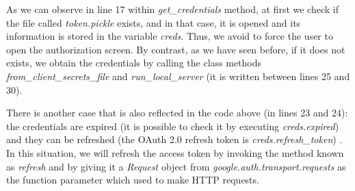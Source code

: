 As we can observe in line 17 within \textit{get\_credentials} method, at first we check if the file called \textit{token.pickle} exists, and in that case, it is opened and its information is stored in the variable \textit{creds}. Thus, we avoid to force the user to open the authorization screen. By contrast, as we have seen before, if it does not exists, we obtain the credentials by calling the class methods \textit{from\_client\_secrets\_file} and \textit{run\_local\_server} (it is written between lines 25 and 30).

There is another case that is also reflected in the code above (in lines 23 and 24): the credentials are expired (it is possible to check it by executing \textit{creds.expired}) and they can be refreshed (the OAuth 2.0 refresh token is \textit{creds.refresh\_token}) \citep{oauth2.credentials}. In this situation, we will refresh the access token by invoking the method known as \textit{refresh} and by giving it a \textit{Request} object \citep{request-lib} from \textit{google.auth.transport.requests} as the function parameter which used to make HTTP requests.